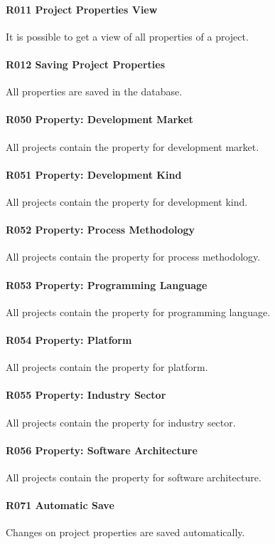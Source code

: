 \paragraph{R011 Project Properties View}
It is possible to get a view of all properties of a project.
\paragraph{R012 Saving Project Properties}
All properties are saved in the database.
\paragraph{R050 Property: Development Market}
All projects contain the property for development market.
\paragraph{R051 Property: Development Kind}
All projects contain the property for development kind.
\paragraph{R052 Property: Process Methodology}
All projects contain the property for process methodology.
\paragraph{R053 Property: Programming Language}
All projects contain the property for programming language.
\paragraph{R054 Property: Platform}
All projects contain the property for platform.
\paragraph{R055 Property: Industry Sector}
All projects contain the property for industry sector.
\paragraph{R056 Property: Software Architecture}
All projects contain the property for software architecture.
\paragraph{R071 Automatic Save}
Changes on project properties are saved automatically.

